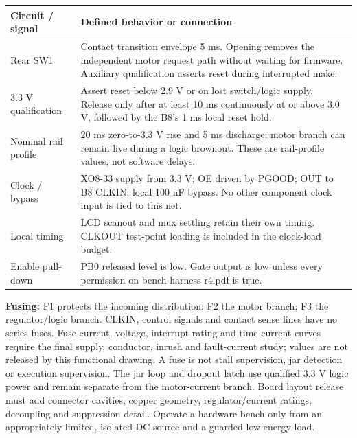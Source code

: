 \begin{tabularx}{\linewidth}{@{}p{.29\linewidth}Y@{}}
\toprule Circuit / signal & Defined behavior or connection\\\midrule
Rear SW1 & Contact transition envelope 5 ms. Opening removes the independent motor request path without waiting for firmware. Auxiliary qualification asserts reset during interrupted make.\\
3.3 V qualification & Assert reset below 2.9 V or on lost switch/logic supply. Release only after at least 10 ms continuously at or above 3.0 V, followed by the B8's 1 ms local reset hold.\\
Nominal rail profile & 20 ms zero-to-3.3 V rise and 5 ms discharge; motor branch can remain live during a logic brownout. These are rail-profile values, not software delays.\\
Clock / bypass & XO8-33 supply from 3.3 V; OE driven by PGOOD; OUT to B8 CLKIN; local 100 nF bypass. No other component clock input is tied to this net.\\
Local timing & LCD scanout and mux settling retain their own timing. CLKOUT test-point loading is included in the clock-load budget.\\
Enable pull-down & PB0 released level is low. Gate output is low unless every permission on bench-harness-r4.pdf is true.\\\bottomrule
\end{tabularx}

\textbf{Fusing:} F1 protects the incoming distribution; F2 the motor branch; F3 the regulator/logic branch. CLKIN, control signals and contact sense lines have no series fuses. Fuse current, voltage, interrupt rating and time-current curves require the final supply, conductor, inrush and fault-current study; values are not released by this functional drawing. A fuse is not stall supervision, jar detection or execution supervision. The jar loop and dropout latch use qualified 3.3 V logic power and remain separate from the motor-current branch.
\vfill\small{Board layout release must add connector cavities, copper geometry, regulator/current ratings, decoupling and suppression detail. Operate a hardware bench only from an appropriately limited, isolated DC source and a guarded low-energy load.}
